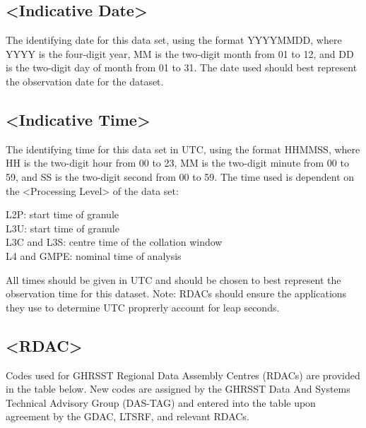 \subsection{<Indicative Date>}
The identifying date for this data set, using the format YYYYMMDD, where YYYY is the four-digit year,
MM is the two-digit month from 01 to 12, and DD is the two-digit day of month from 01 to 31. The date
used should best represent the observation date for the dataset. \par

\subsection{<Indicative Time>}
The identifying time for this data set in UTC, using the format HHMMSS, where HH is the two-digit
hour from 00 to 23, MM is the two-digit minute from 00 to 59, and SS is the two-digit second from 00 to
59. The time used is dependent on the <Processing Level> of the data set: \par \vspace{0.5in}

L2P: start time of granule \\
L3U: start time of granule \\ 
L3C and L3S: centre time of the collation window \\ 
L4 and GMPE: nominal time of analysis \par \vspace{0.1in}
All times should be given in UTC and should be chosen to best represent the observation time for this
dataset. Note: RDACs should ensure the applications they use to determine UTC proprerly account
for leap seconds.

\subsection{<RDAC>}
Codes used for GHRSST Regional Data Assembly Centres (RDACs) are provided in the table below.
New codes are assigned by the GHRSST Data And Systems Technical Advisory Group (DAS-TAG)
and entered into the table upon agreement by the GDAC, LTSRF, and relevant RDACs. \par



